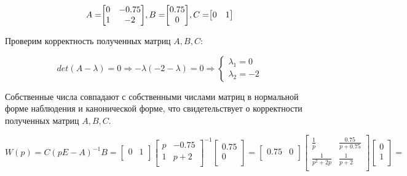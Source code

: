 \documentclass[14pt,a4paper,report]{report}
\begin{document}
\begin{equation*}
\text{$A=$}
\text{$
	\begin{bmatrix}
	0 & -0.75 \\
	1 & -2 \\
	\end{bmatrix}
	$}
\text{$, B=$}
\text{$
	\begin{bmatrix}
	0.75 \\
	0 \\
	\end{bmatrix}
	$}
\text{$, C=$}
\text{$
	\begin{bmatrix}
	0 & 1 \\
	\end{bmatrix}
	$}
\end{equation*}

Проверим корректность полученных матриц $A, B, C$:

\begin{equation*}
\text{$det(A-\lambda)=0$}
\Longrightarrow
\text{$-\lambda(-2-\lambda)=0$}
\Longrightarrow
\begin{cases}
	\text{$\lambda_1=0$} \\
	\text{$\lambda_2=-2$}
\end{cases}
\end{equation*}

Собственные числа совпадают с собственными числами матриц в нормальной форме наблюдения и канонической форме, что свидетельствует о корректности полученных матриц  $A, B, C$.

\begin{equation*}
\text{$W(p)=C(pE-A)^{-1}B=
\begin{bmatrix}
0 & 1 \\
\end{bmatrix}
\begin{bmatrix}
p & -0.75 \\
1 & p+2\\
\end{bmatrix}^{-1}
\begin{bmatrix}
0.75 \\
0 \\
\end{bmatrix}=\begin{bmatrix}
0.75 & 0 \\
\end{bmatrix}
\begin{bmatrix}
\frac{1}{p} & \frac{0.75}{p+0.75} \\
\frac{1}{p^2+2p} & \frac{1}{p+2}\\
\end{bmatrix}
\begin{bmatrix}
0\\
1 \\
\end{bmatrix}=
$}
\end{equation*}
\end{document}
